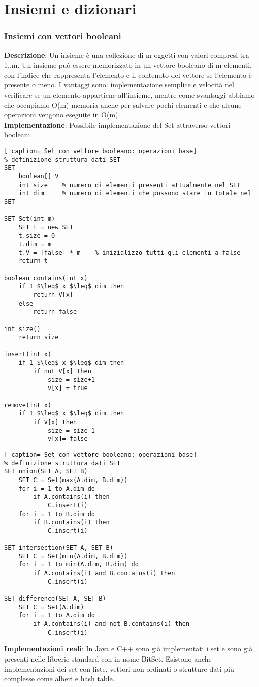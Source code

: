 \documentclass[../cheatSheetAlgoritmi.tex]{subfiles}
\begin{document}
\chapter{Insiemi e dizionari}
\subsection{Insiemi con vettori booleani}
\textbf{Descrizione}: Un insieme è una collezione di m oggetti con valori compresi tra 1..m. Un insieme può essere memorizzato in un vettore booleano di m elementi, con l'indice che rappresenta l'elemento e il contenuto del vettore se l'elemento è presente o meno. I vantaggi sono: implementazione semplice e velocità nel verificare se un elemento appartiene all'insieme, mentre come svantaggi abbiamo che occupiamo O(m) memoria anche per salvare pochi elementi e che alcune operazioni vengono eseguite in O(m).\\
\textbf{Implementazione}: Possibile implementazione del Set attraverso vettori booleani.\
\begin{lstlisting}[ caption= Set con vettore booleano: operazioni base]
% definizione struttura dati SET
SET 
	boolean[] V
	int size	% numero di elementi presenti attualmente nel SET
	int dim		% numero di elementi che possono stare in totale nel SET
	
SET Set(int m)
	SET t = new SET
	t.size = 0
	t.dim = m
	t.V = [false] * m    % inizializzo tutti gli elementi a false
	return t
	
boolean contains(int x)
	if 1 $\leq$ x $\leq$ dim then
		return V[x]
	else
		return false
		
int size()
	return size

insert(int x)
	if 1 $\leq$ x $\leq$ dim then
		if not V[x] then
			size = size+1
			v[x] = true
			
remove(int x)
	if 1 $\leq$ x $\leq$ dim then 
		if V[x] then
			size = size-1
			v[x]= false
\end{lstlisting}
\newpage
\begin{lstlisting}[ caption= Set con vettore booleano: operazioni base]
% definizione struttura dati SET
SET union(SET A, SET B)
	SET C = Set(max(A.dim, B.dim))
	for i = 1 to A.dim do
		if A.contains(i) then
			C.insert(i)
	for i = 1 to B.dim do
		if B.contains(i) then
			C.insert(i)

SET intersection(SET A, SET B)
	SET C = Set(min(A.dim, B.dim))
	for i = 1 to min(A.dim, B.dim) do
		if A.contains(i) and B.contains(i) then
			C.insert(i)

SET difference(SET A, SET B)
	SET C = Set(A.dim)
	for i = 1 to A.dim do
		if A.contains(i) and not B.contains(i) then
			C.insert(i)	
\end{lstlisting}	
\textbf{Implementazioni reali}: In Java e C++ sono già implementati i set e sono già presenti nelle librerie standard con in nome BitSet. Esistono anche implementazioni dei set con liste, vettori non ordinati o strutture dati più complesse come alberi e hash table.
\end{document}
